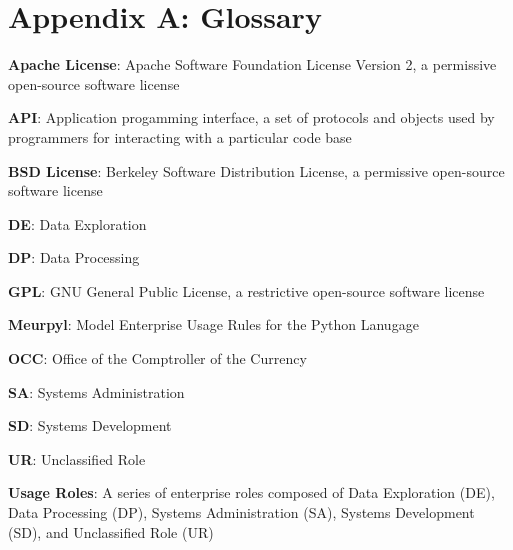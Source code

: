 \newcommand{\definition}[2]{
	\textbf{#1}: #2
}

\section{Appendix A: Glossary}

\thispagestyle{section_start_style}

\vspace*{.3cm}

\setlength{\parskip}{.5em}

    \definition{Apache License}{Apache Software Foundation License Version 2, a permissive open-source software license}

    \definition{API}{Application progamming interface, a set of protocols and objects used by programmers for interacting with a particular code base}

    \definition{BSD License}{Berkeley Software Distribution License, a permissive open-source software license}

	\definition{DE}{Data Exploration}

	\definition{DP}{Data Processing}

    \definition{GPL}{GNU General Public License, a restrictive open-source software license}

	\definition{Meurpyl}{Model Enterprise Usage Rules for the Python Lanugage}

	\definition{OCC}{Office of the Comptroller of the Currency}

	\definition{SA}{Systems Administration}

	\definition{SD}{Systems Development}

	\definition{UR}{Unclassified Role}

	\definition{Usage Roles}{A series of enterprise roles composed of Data Exploration (DE), Data Processing (DP), Systems Administration (SA), Systems Development (SD), and Unclassified Role (UR)}

\setlength{\parskip}{1em}
